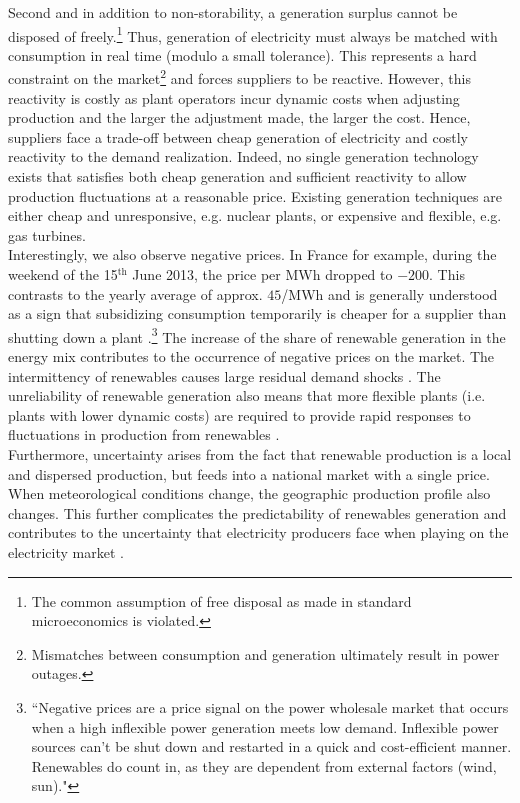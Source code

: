 Second and in addition to non-storability, a generation surplus cannot be disposed of freely.\footnote{The common assumption of free disposal as made in standard microeconomics is violated.} Thus, generation of electricity must always be matched with consumption in real time (modulo a small tolerance). This represents a hard constraint on the market\footnote{Mismatches between consumption and generation ultimately result in power outages.} and forces suppliers to be reactive. However, this reactivity is costly as plant operators incur dynamic costs when adjusting production and the larger the adjustment made, the larger the cost. 
Hence, suppliers face a trade-off between cheap generation of electricity and costly reactivity to the demand realization. Indeed, no single generation technology exists that satisfies both cheap generation and sufficient reactivity to allow production fluctuations at a reasonable price. Existing generation techniques are either cheap and unresponsive, e.g. nuclear plants, or expensive and flexible, e.g. gas turbines. \\
 
Interestingly, we also observe negative prices. In France for example, during the weekend of the 15$^\text{th}$ June 2013, the price per MWh dropped to $-200$\EUR{}. This contrasts to the yearly average of approx. $ 45$\EUR{}/MWh and is generally understood as a sign that subsidizing consumption temporarily is cheaper for a supplier than shutting down a plant \cite{epexwebsite1}.\footnote{``Negative prices are a price signal on the power wholesale market that occurs when a high inflexible power generation meets low demand. Inflexible power sources can’t be shut down and restarted in a quick and cost-efficient manner. Renewables do count in, as they are dependent from external factors (wind, sun)."} The increase of the share of renewable generation in the energy mix contributes to the occurrence of negative prices on the market. The intermittency of renewables causes large residual demand shocks \cite{epexwebsite1}. The unreliability of renewable generation also means that more flexible plants (i.e. plants with lower dynamic costs) are required to provide rapid responses to fluctuations in production from renewables \cite{ren2013renewables}. \\

Furthermore, uncertainty arises from the fact that renewable production is a local and dispersed production, but feeds into a national market with a single price. When meteorological conditions change, the geographic production profile also changes. This further complicates the predictability of renewables generation and contributes to the uncertainty that electricity producers face when playing on the electricity market \cite{meibom2009operational}.\\

